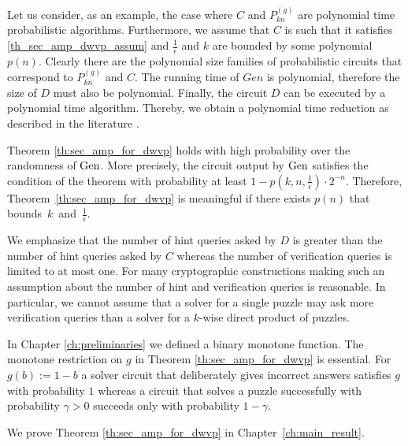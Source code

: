 Let us consider, as an example, the case where $C$ and $P_{kn}^{(g)}$ are polynomial time probabilistic algorithms.
Furthermore, we assume that $C$ is such that it satisfies \eqref{th_sec_amp_dwvp_assum}
and $\frac{1}{\epsilon}$ and $k$ are bounded by some polynomial $p(n)$.
Clearly there are the polynomial size families of probabilistic circuits that correspond to $P_{kn}^{(g)}$ and $C$.
The running time of $Gen$ is polynomial, therefore the size of $D$ must also be polynomial.
Finally, the circuit $D$ can be executed by a polynomial time algorithm.
Thereby, we obtain a polynomial time reduction as described in the literature \cite{Arora:2009:CCM:1540612, LectureNotesCrypo}.

Theorem \ref{th:sec_amp_for_dwvp} holds with high probability over the randomness of $\operatorname{\text{Gen}}$.
More precisely, the circuit output by $\operatorname{\text{Gen}}$ satisfies the condition of the theorem with probability
at least $1 - p(k, n, \frac{1}{\epsilon}) \cdot 2^{-n}$. Therefore, Theorem~\ref{th:sec_amp_for_dwvp} is meaningful if there exists $p(n)$
that bounds~$k$~and~$\frac{1}{\epsilon}$.

We emphasize that the number of hint queries asked by $D$ is greater than the number of hint queries asked by $C$ whereas the number of verification queries
is limited to at most one. For many cryptographic constructions making such an assumption about the number of hint and verification queries is reasonable.
In particular, we cannot assume that a solver for a single puzzle may ask more verification queries than a solver for a $k$-wise direct product of puzzles.

In Chapter \ref{ch:preliminaries} we defined a binary monotone function.
The monotone restriction on $g$ in Theorem \ref{th:sec_amp_for_dwvp} is essential. For $g(b) := 1 - b$ a solver circuit that deliberately gives incorrect
answers satisfies $g$ with probability $1$ whereas a circuit that solves a puzzle successfully with probability
$\gamma > 0$ succeeds only with probability $1 - \gamma$.

We prove Theorem \ref{th:sec_amp_for_dwvp} in Chapter~\ref{ch:main_result}.

